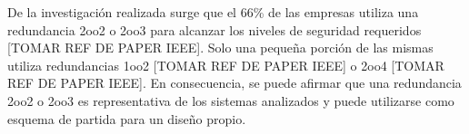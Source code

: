 	De la investigación realizada surge que el 66\% de las empresas utiliza una redundancia 2oo2 o 2oo3 para alcanzar los niveles de seguridad requeridos [TOMAR REF DE PAPER IEEE]. Solo una pequeña porción de las mismas utiliza redundancias 1oo2 [TOMAR REF DE PAPER IEEE] o 2oo4 [TOMAR REF DE PAPER IEEE]. En consecuencia, se puede afirmar que una redundancia 2oo2 o 2oo3 es representativa de los sistemas analizados y puede utilizarse como esquema de partida para un diseño propio.